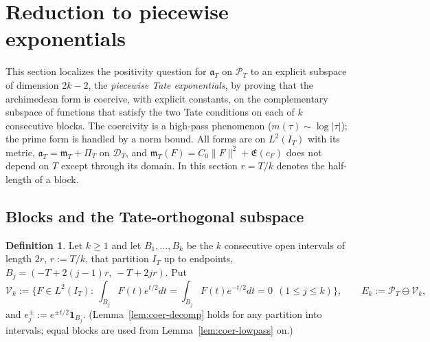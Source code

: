 \documentclass[11pt]{amsart}
\theoremstyle{definition}
\newtheorem{definition}[theorem]{Definition}
\theoremstyle{remark}
\newcommand{\PT}{\mathcal P_T}
\newcommand{\IT}{I_T}
\newcommand{\cF}{c_F}
\newcommand{\Lev}{\mathfrak E}
\newcommand{\PiT}{\Pi_T}
\newcommand{\mT}{\mathfrak m_T}
\begin{document}
\section{Reduction to piecewise exponentials}\label{sec:coer}

This section localizes the positivity question for $\mathfrak a_T$ on $\PT$ to an explicit subspace of
dimension $2k-2$, the \emph{piecewise Tate exponentials}, by proving that the archimedean form is coercive,
with explicit constants, on the complementary subspace of functions that satisfy the two Tate conditions on
each of $k$ consecutive blocks. The coercivity is a high-pass phenomenon ($m(\tau)\sim\log|\tau|$); the prime
form is handled by a norm bound. All forms are on $L^2(\IT)$ with its metric, $\mathfrak a_T=\mT+\PiT$ on
$\mathcal D_T$, and $\mT(F)=C_0\|F\|^2+\Lev(\cF)$ does not depend on $T$ except through its domain. In this
section $r=T/k$ denotes the half-length of a block.

\subsection{Blocks and the Tate-orthogonal subspace}\label{subsec:coer-blocks}

\begin{definition}\label{def:coer-V}
Let $k\ge1$ and let $B_1,\dots,B_k$ be the $k$ consecutive open intervals of length $2r$,
$r:=T/k$, that partition $\IT$ up to endpoints, $B_j=(-T+2(j-1)r,\,-T+2jr)$. Put
\[
\mathcal V_k:=\Big\{F\in L^2(\IT):\ \int_{B_j}F(t)e^{t/2}dt=\int_{B_j}F(t)e^{-t/2}dt=0\ \ (1\le j\le k)\Big\},
\qquad E_k:=\PT\ominus\mathcal V_k ,
\]
and $e_j^\pm:=e^{\pm t/2}\mathbf 1_{B_j}$. (Lemma~\ref{lem:coer-decomp} holds for any partition into
intervals; equal blocks are used from Lemma~\ref{lem:coer-lowpass} on.)
\end{definition}
\end{document}
